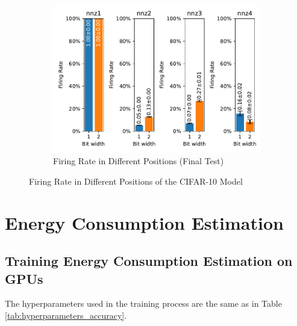         \begin{figure}[H]
            \centering
            \ContinuedFloat
            \begin{subfigure}[H]{\textwidth}
                \centering
                \includegraphics[width=\textwidth]{../firerate/CIFAR10/plots/cifar10_final_firerate.pdf}
                \caption{Firing Rate in Different Positions (Final Test)}
            \end{subfigure}
            \caption{Firing Rate in Different Positions of the CIFAR-10 Model}
        \end{figure}

\chapter{Energy Consumption Estimation}
\label{appendix:energy}

\section{Training Energy Consumption Estimation on GPUs}
\label{appendix:energy_gpu}

    The hyperparameters used in the training process are the same as in Table \ref{tab:hyperparameters_accuracy}.

    \label{appendix:energy_gpu_fashion_mnist}


